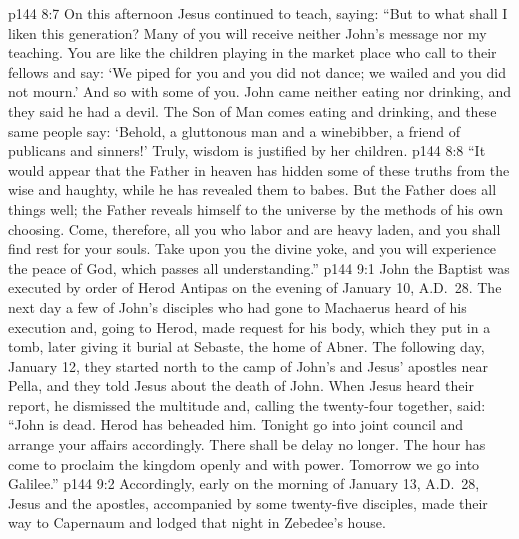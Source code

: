 \vs p144 8:7 On this afternoon Jesus continued to teach, saying: \textcolor{ubdarkred}{“But to what shall I liken this generation? Many of you will receive neither John’s message nor my teaching. You are like the children playing in the market place who call to their fellows and say: ‘We piped for you and you did not dance; we wailed and you did not mourn.’ And so with some of you. John came neither eating nor drinking, and they said he had a devil. The Son of Man comes eating and drinking, and these same people say: ‘Behold, a gluttonous man and a winebibber, a friend of publicans and sinners!’ Truly, wisdom is justified by her children.}
\vs p144 8:8 \textcolor{ubdarkred}{“It would appear that the Father in heaven has hidden some of these truths from the wise and haughty, while he has revealed them to babes. But the Father does all things well; the Father reveals himself to the universe by the methods of his own choosing. Come, therefore, all you who labor and are heavy laden, and you shall find rest for your souls. Take upon you the divine yoke, and you will experience the peace of God, which passes all understanding.”}\plusone
{}
\vs p144 9:1 John the Baptist was executed by order of Herod Antipas on the evening of January 10, A.D.~28. The next day a few of John’s disciples who had gone to Machaerus heard of his execution and, going to Herod, made request for his body, which they put in a tomb, later giving it burial at Sebaste, the home of Abner. The following day, January 12, they started north to the camp of John’s and Jesus’ apostles near Pella, and they told Jesus about the death of John. When Jesus heard their report, he dismissed the multitude and, calling the twenty\hyp{}four together, said: \textcolor{ubdarkred}{“John is dead. Herod has beheaded him. Tonight go into joint council and arrange your affairs accordingly. There shall be delay no longer. The hour has come to proclaim the kingdom openly and with power. Tomorrow we go into Galilee.”}
\vs p144 9:2 Accordingly, early on the morning of January 13, A.D.~28, Jesus and the apostles, accompanied by some twenty\hyp{}five disciples, made their way to Capernaum and lodged that night in Zebedee’s house.
